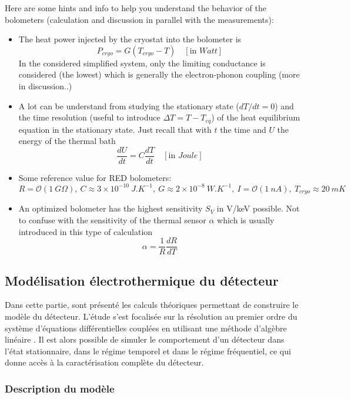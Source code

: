 Here are some hints and info to help you understand the behavior of the bolometers (calculation and discussion in parallel with the measurements):
\begin{itemize}
	\item The heat power injected by the cryostat into the bolometer is $$P_{cryo} = G \left( T_{cryo} - T\right) \quad [\textrm{in } Watt]$$ In the considered simplified system, only the limiting conductance is considered (the lowest) which is generally the electron-phonon coupling (more in discussion..)
	\item A lot can be understand from studying the stationary state ($dT/dt=0$) and the time resolution (useful to introduce $\Delta T = T - T_{eq}$) of the heat equilibrium equation in the stationary state. Just recall that with $t$ the time and $U$ the energy of the thermal bath $$\frac{dU}{dt} = C \frac{dT}{dt} \quad [\textrm{in }  Joule]$$
	\item Some reference value for RED bolometers:
	$$ R = \mathcal{O}(1 \ G\Omega),\
	C \approx 3 \times 10^{-10} \ J.K^{-1},\
	G \approx 2 \times 10^{-8} \ W.K^{-1},\
	I = \mathcal{O}(1 \ nA),\
	T_{cryo} \approx 20 \ mK $$
	\item An optimized bolometer has the highest sensitivity $S_V$ in V/keV possible. Not to confuse with the sensitivity of the thermal sensor $\alpha$ which is usually introduced in this type of calculation 
	$$\alpha = \frac{1}{R} \frac{dR}{dT} $$
\end{itemize}


\subsection{Modélisation électrothermique du détecteur}

Dans cette partie, sont présenté les calculs théoriques permettant de construire le modèle du détecteur. L'étude s'est focalisée sur la résolution au premier ordre du système d'équations différentielles couplées en utilisant une méthode d'algèbre linéaire \cite{matrix}. Il est alors possible de simuler le comportement d'un détecteur dans l'état stationnaire, dans le régime temporel et dans le régime fréquentiel, ce qui donne accès à la caractérisation complète du détecteur.

\subsubsection{Description du modèle}

